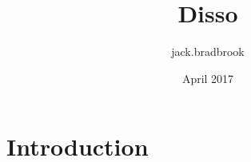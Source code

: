 \documentclass{article}
\title{Disso}
\author{jack.bradbrook }
\date{April 2017}
\begin{document}
\maketitle

\section{Introduction}
\end{document}
